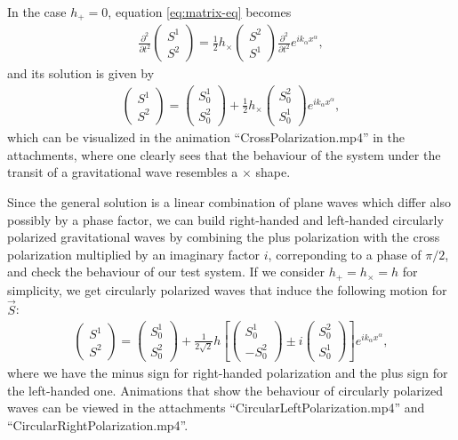 \documentclass[a4paper]{article}
\begin{document}
    
In the case $h_{+} = 0$, equation \eqref{eq:matrix-eq} becomes
\begin{align}
  \frac{\partial^2}{\partial t^2}\begin{pmatrix}
    S^1\\
    S^2
  \end{pmatrix} = \frac{1}{2}h_{\times}\begin{pmatrix}
    S^2\\
    S^1
  \end{pmatrix}\frac{\partial^2}{\partial t^2}e^{ik_{\alpha}x^{\alpha}},
\end{align}
and its solution is given by
\begin{align}
  \begin{pmatrix}
    S^1\\
    S^2
  \end{pmatrix} = \begin{pmatrix}
    S^1_0\\
    S^2_0
  \end{pmatrix}+\frac{1}{2}h_{\times}\begin{pmatrix}
    S^2_0\\
    S^1_0
  \end{pmatrix}e^{ik_{\alpha}x^{\alpha}},
\end{align}
which can be visualized in the animation ``CrossPolarization.mp4'' in the attachments, where one clearly sees that the behaviour of the system under the transit of a gravitational wave resembles a $\times$ shape.

Since the general solution is a linear combination of plane waves which differ also possibly by a phase factor, we can build right-handed and left-handed circularly polarized gravitational waves by combining the plus polarization with the cross polarization multiplied by an imaginary factor $i$, correponding to a phase of $\pi/2$, and check the behaviour of our test system. If we consider $h_{+} = h_{\times} = h$ for simplicity, we get circularly polarized waves that induce the following motion for $\vec{S}$:
\begin{align}
  \begin{pmatrix}
    S^1\\
    S^2
  \end{pmatrix} = \begin{pmatrix}
    S^1_0\\
    S^2_0
  \end{pmatrix}+\frac{1}{2\sqrt{2}}h\left[\begin{pmatrix}
    S^1_0\\
    -S^2_0
  \end{pmatrix} \pm i \begin{pmatrix}
    S_0^2\\
    S_0^1
  \end{pmatrix}\right]e^{ik_{\alpha}x^{\alpha}},
\end{align}
where we have the minus sign for right-handed polarization and the plus sign for the left-handed one.
Animations that show the behaviour of circularly polarized waves can be viewed in the attachments ``CircularLeftPolarization.mp4'' and ``CircularRightPolarization.mp4''.
\end{document}
